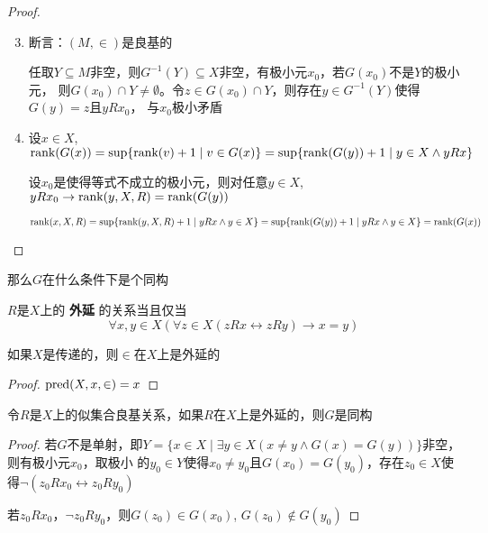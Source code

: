 \documentclass[11pt]{article}
\begin{document}
\begin{proof}
\begin{enumerate}
\setcounter{enumi}{2}
\item 断言：\((M,\in)\)是良基的

任取\(Y\subseteq M\)非空，则\(G^{-1}(Y)\subseteq X\)非空，有极小元\(x_0\)，若\(G(x_0)\)不是\(Y\)的极小元，
则\(G(x_0)\cap Y\neq\emptyset\)。令\(z\in G(x_0)\cap Y\)，则存在\(y\in G^{-1}(Y)\)使得\(G(y)=z\)且\(yRx_0\)，
与\(x_0\)极小矛盾
\item 设\(x\in X\), \(\text{rank}(G(x))=\sup\{\text{rank}(v)+1\mid v\in G(x)\}=\sup\{\text{rank}(G(y))+1\mid y\in X\wedge yRx\}\)

设\(x_0\)是使得等式不成立的极小元，则对任意\(y\in X\), \(yRx_0\to\text{rank}(y,X,R)=\text{rank}(G(y))\)

\(\text{rank}(x,X,R)=\sup\{\text{rank}(y,X,R)+1\mid yRx\wedge y\in X\}=\sup\{\text{rank}(G(y))+1\mid yRx\wedge y\in X\}=\text{rank}(G(x))\)
\end{enumerate}
\end{proof}

那么\(G\)在什么条件下是个同构

\begin{definition}[]
\(R\)是\(X\)上的 \textbf{外延} 的关系当且仅当
\begin{equation*}
\forall x,y\in X(\forall z\in X(zRx\leftrightarrow zRy)\to x=y)
\end{equation*}
\end{definition}

\begin{lemma}[]
如果\(X\)是传递的，则\(\in\)在\(X\)上是外延的
\end{lemma}

\begin{proof}
\(\text{pred}(X,x,\in)=x\)
\end{proof}

\begin{lemma}[]
令\(R\)是\(X\)上的似集合良基关系，如果\(R\)在\(X\)上是外延的，则\(G\)是同构
\end{lemma}

\begin{proof}
若\(G\)不是单射，即\(Y=\{x\in X\mid\exists y\in X(x\neq y\wedge G(x)=G(y))\}\)非空，则有极小元\(x_0\)，取极小
的\(y_0\in Y\)使得\(x_0\neq y_0\)且\(G(x_0)=G(y_0)\)，存在\(z_0\in X\)使得\(\neg(z_0Rx_0\leftrightarrow z_0Ry_0)\)

若\(z_0Rx_0\)，\(\neg z_0Ry_0\)，则\(G(z_0)\in G(x_0)\), \(G(z_0)\notin G(y_0)\)
\end{proof}
\end{document}
